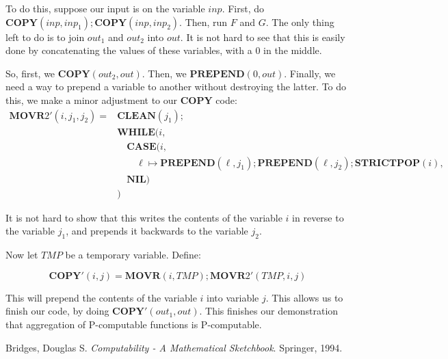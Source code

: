 \documentclass{article}
\newcommand{\NIL}{\mathbf{NIL}}
\newcommand{\PREPEND}{\mathbf{PREPEND}}
\newcommand{\STRICTPOP}{\mathbf{STRICTPOP}}
\newcommand{\CASE}{\mathbf{CASE}}
\newcommand{\WHILE}{\mathbf{WHILE}}
\newcommand{\CLEAN}{\mathbf{CLEAN}}
\newcommand{\MOVR}{\mathbf{MOVR}}
\newcommand{\COPY}{\mathbf{COPY}}
\begin{document}
	To do this, suppose our input is on the variable $inp$. First, do $\COPY(inp, inp_1); \COPY(inp, inp_2)$. Then, run $F$ and $G$. The only thing left to do is to join $out_1$ and $out_2$ into $out$. It is not hard to see that this is easily done by concatenating the values of these variables, with a 0 in the middle.
	
	So, first, we $\COPY(out_2, out)$. Then, we $\PREPEND(0, out)$. Finally, we need a way to prepend a variable to another without destroying the latter. To do this, we make a minor adjustment to our $\COPY$ code:
	\begin{align*}
	\MOVR2'(i, j_1, j_2) =& \CLEAN(j_1);\\
	& \WHILE(i,\\
	&\quad \CASE(i,\\
	&\quad \quad \ell \mapsto \PREPEND(\ell, j_1); \PREPEND(\ell, j_2); \STRICTPOP(i),\\
	&\quad \NIL)\\
	&)
	\end{align*}
	
	It is not hard to show that this writes the contents of the variable $i$ in reverse to the variable $j_1$, and prepends it backwards to the variable $j_2$.
	
	Now let $TMP$ be a temporary variable. Define:
	
	\[\COPY'(i, j) = \MOVR(i, TMP); \MOVR2'(TMP, i, j)\]
	
	This will prepend the contents of the variable $i$ into variable $j$. This allows us to finish our code, by doing $\COPY'(out_1, out)$. This finishes our demonstration that aggregation of P-computable functions is P-computable.
	
	
\begin{thebibliography}{9}
Bridges, Douglas S.
\textit{Computability - A Mathematical Sketchbook}. 
Springer, 1994. %
\end{thebibliography}	
\end{document}
